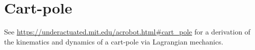 \section{Cart-pole}

See \url{https://underactuated.mit.edu/acrobot.html#cart_pole} for a derivation
of the kinematics and dynamics of a cart-pole via Lagrangian mechanics.
